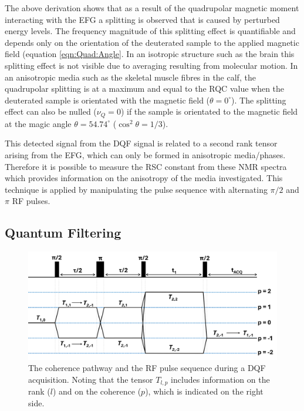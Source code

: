 \documentclass[class=article, crop=false]{standalone}
\begin{document}
The above derivation shows that as a result of the quadrupolar magnetic moment interacting with the EFG a splitting is observed that is caused by perturbed energy levels. The frequency magnitude of this splitting effect is quantifiable and depends only on the orientation of the deuterated sample to the applied magnetic field (equation \ref{eqn:Quad:Angle}. In an isotropic structure such as the brain this splitting effect is not visible due to averaging resulting from molecular motion. In an anisotropic media such as the skeletal muscle fibres in the calf, the quadrupolar splitting is at a maximum and equal to the RQC value when the deuterated sample is orientated with the magnetic field ($\theta = 0^\circ$). The splitting effect can also be nulled ($\nu_Q = 0$) if the sample is orientated to the magnetic field at the magic angle $\theta = 54.74^\circ$ ($\cos^2\theta=1/3$).

This detected signal from the DQF signal is related to a second rank tensor arising from the EFG, which can only be formed in anisotropic media/phases. Therefore it is possible to measure the RSC constant from these NMR spectra which provides information on the anisotropy of the media investigated. This technique is applied by manipulating the pulse sequence with alternating $\pi/2$ and $\pi$ RF pulses. 

\subsection{Quantum Filtering}

\begin{figure}
    \centering
    \includegraphics[width=1\textwidth]{Figures/Quad/DQF_Coherence.png}
    \caption{The coherence pathway and the RF pulse sequence during a DQF acquisition. Noting that the tensor $T_{l,p}$ includes information on the rank ($l$) and on the coherence ($p$), which is indicated on the right side.}
    \label{fig:Quad:Coherence}
\end{figure}
\end{document}
